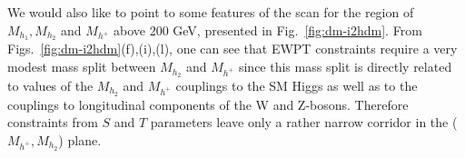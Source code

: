 \documentclass[12pt,a4paper]{article}
\begin{document}

We would also like to point to some features of the scan for  the region of $M_{h_1},M_{h_2}$ and
$M_{h^{+}}$ above 200 GeV, presented  in Fig.~\ref{fig:dm-i2hdm}. From 
Figs.~\ref{fig:dm-i2hdm}(f),(i),(l), one can see that EWPT constraints require a very  modest
mass split between $M_{h_2}$ and $M_{h^{+}}$ since this mass split is directly related to
values of the $M_{h_2}$ and $M_{h^{+}}$ couplings to  the SM Higgs as well as to the couplings
to longitudinal components of the W and Z-bosons. Therefore constraints from $S$ and $T$
parameters leave only a rather narrow corridor in the  ($M_{h^{+}},M_{h_2}$) plane.
\end{document}
